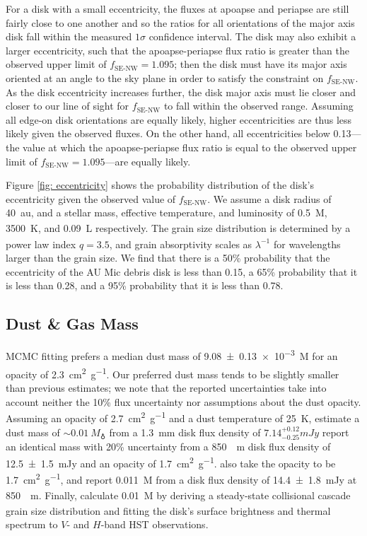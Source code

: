 \documentclass[modern]{aastex62}
\begin{document}
For a disk with a small eccentricity, the fluxes at apoapse and periapse are still fairly close to one another and so the ratios for all orientations of the major axis disk fall within the measured $1\sigma$ confidence interval. 
The disk may also exhibit a larger eccentricity, such that the apoapse-periapse flux ratio is greater than the observed upper limit of $f_{\text{SE-NW}}=1.095$; then the disk must have its major axis oriented at an angle to the sky plane in order to satisfy the constraint on $f_{\text{SE-NW}}$. 
As the disk eccentricity increases further, the disk major axis must lie closer and closer to our line of sight for $f_{\text{SE-NW}}$ to fall within the observed range.
Assuming all edge-on disk orientations are equally likely, higher eccentricities are thus less likely given the observed fluxes. 
On the other hand, all eccentricities below 0.13---the value at which the apoapse-periapse flux ratio is equal to the observed upper limit of $f_{\text{SE-NW}}=1.095$---are equally likely. 

Figure \ref{fig: eccentricity} shows the probability distribution of the disk's eccentricity given the observed value of $f_{\text{SE-NW}}$.
We assume a disk radius of \SI{40}{au}, and a stellar mass, effective temperature, and luminosity of \SI{0.5}{M_\sun}, \SI{3500}{K}, and \SI{0.09}{L_\sun} respectively. 
The grain size distribution is determined by a power law index $q=3.5$, and grain absorptivity scales as $\lambda^{-1}$ for wavelengths larger than the grain size.
We find that there is a 50\% probability that the eccentricity of the AU Mic debris disk is less than 0.15, a 65\% probability that it is less than 0.28, and a 95\% probability that it is less than 0.78.


\subsection{Dust \& Gas Mass}
\label{subsection: dust mass}

MCMC fitting prefers a median dust mass of \SI{9.08 \pm 0.13e-3}{M_\earth} for an opacity of \SI{2.3}{cm^2.g^{-1}}.
Our preferred dust mass tends to be slightly smaller than previous estimates; we note that the reported uncertainties take into account neither the 10\% flux uncertainty nor assumptions about the dust opacity.
Assuming an opacity of \SI{2.7}{cm^2.g^{-1}} and a dust temperature of \SI{25}{K}, \citet{macgregor13} estimate a dust mass of $\sim \SI{0.01}{M_\earth}$ from a \SI{1.3}{mm} disk flux density of $7.14^{+0.12}_{-0.25} \si{mJy}$ 
\citet{matthews15} report an identical mass with 20\% uncertainty from a \SI{850}{\mu m} disk flux density of \SI{12.5 \pm 1.5}{mJy} and an opacity of \SI{1.7}{cm^2.g^{-1}}.
\citet{liu04} also take the opacity to be \SI{1.7}{cm^2.g^{-1}}, and report \SI{0.011}{M_\earth} from a disk flux density of \SI{14.4 \pm 1.8}{mJy} at \SI{850}{\mu m}.
Finally, \citet{strubbe&chiang06} calculate \SI{0.01}{M_\earth} by deriving a steady-state collisional cascade grain size distribution and fitting the disk's surface brightness and thermal spectrum to $V$- and $H$-band HST observations.
\end{document}

